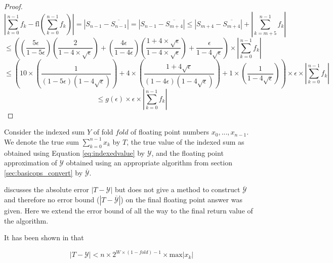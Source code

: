 \documentclass[12pt]{article}
\providecommand{\max}{\ensuremath{\text{max}}}
\providecommand{\fl}{\ensuremath{\text{fl}}}
\theoremstyle{definition}
\numberwithin{equation}{section}
\begin{document}
\begin{proof}
        \begin{equation*}
          |\sum \limits_{k = 0}^{n - 1} f_k - \fl(\sum \limits_{k = 0}^{n - 1} f_k)| = |S_{n - 1} - \overline{S_{n - 1}}| = |S_{n - 1} - \overline{S_{m + 4}}| \leq |S_{m + 4} - \overline{S_{m + 4}}| + |\sum\limits_{k = m + 5}^{n - 1}f_k|
        \end{equation*}
        \begin{equation*}
          \leq ((\frac{5\epsilon}{1 - 5 \epsilon})(\frac{2}{1 - 4 \times \sqrt\epsilon}) + (\frac{4\epsilon}{1 - 4 \epsilon})(\frac{1 + 4 \times \sqrt\epsilon}{1 - 4 \times \sqrt\epsilon}) + \frac{\epsilon}{1 - 4 \sqrt\epsilon})\times |\sum\limits_{k = 0}^{n - 1}f_k|
        \end{equation*}
        \begin{equation*}
          \leq (10 \times (\frac{1}{(1 - 5 \epsilon)(1 - 4 \sqrt\epsilon)}) + 4 \times (\frac{1 + 4 \sqrt \epsilon}{(1 - 4 \epsilon)(1 - 4 \sqrt\epsilon)}) + 1 \times (\frac{1}{1 - 4 \sqrt\epsilon}))\times \epsilon \times |\sum\limits_{k = 0}^{n - 1}f_k|
        \end{equation*}
        \begin{equation*}
          \leq g(\epsilon)\times \epsilon\times |\sum\limits_{k = 0}^{n - 1}f_k|
        \end{equation*}
    \end{proof}

    Consider the indexed sum $Y$ of fold $fold$ of floating point numbers $x_0, ..., x_{n - 1}$. We denote the true sum $\sum \limits_{k = 0}^{n - 1} x_k$ by $T$, the true value of the indexed sum as obtained using Equation \ref{eq:indexedvalue} by $\mathcal{Y}$, and the floating point approximation of $\mathcal{Y}$ obtained using an appropriate algorithm from section \ref{sec:basicops_convert} by $\overline{\mathcal{Y}}$.

    \cite{repsum} discusses the absolute error $|T - \mathcal{Y}|$ but does not give a method to construct $\overline{\mathcal{Y}}$ and therefore no error bound ($|T - \overline{\mathcal{Y}}|$) on the final floating point answer was given. Here we extend the error bound of \cite{repsum} all the way to the final return value of the algorithm.

    It has been shown in \cite{repsum} that

    \begin{equation}
      \label{eq:repboundnaive}
      |T - \mathcal{Y}| < n \times 2^{W \times (1 - fold) - 1} \times \max|x_k|
    \end{equation}
\end{document}
